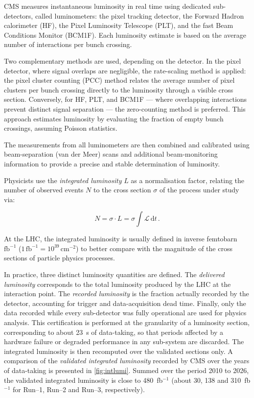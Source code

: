 \vspace{0.5 cm}

CMS measures instantaneous luminosity in real time using dedicated sub-detectors, called luminometers: the pixel tracking detector, the Forward Hadron calorimeter (HF), the Pixel Luminosity Telescope (PLT), and the fast Beam Conditions Monitor (BCM1F). Each luminosity estimate is based on the average number of interactions per bunch crossing.

Two complementary methods are used, depending on the detector. In the pixel detector, where signal overlaps are negligible, the rate-scaling method is applied: the pixel cluster counting (PCC) method relates the average number of pixel clusters per bunch crossing directly to the luminosity through a visible cross section. Conversely, for HF, PLT, and BCM1F --- where overlapping interactions prevent distinct signal separation --- the zero-counting method is preferred. This approach estimates luminosity by evaluating the fraction of empty bunch crossings, assuming Poisson statistics.

The measurements from all luminometers are then combined and calibrated using beam-separation (van der Meer) scans and additional beam-monitoring information to provide a precise and stable determination of luminosity.

\vspace{0.5 cm}

Physicists use the \textit{integrated luminosity} $L$ as a normalisation factor, relating the number of observed events $N$ to the cross section $\sigma$ of the process under study via:

\begin{equation}
    N = \sigma \cdot L = \sigma \int \mathscr{L} \, \mathrm{d}t \,.
    \label{eq:intlumi}
\end{equation}

At the LHC, the integrated luminosity is usually defined in inverse femtobarn $\mathrm{fb}^{-1}$ ($1\,\mathrm{fb}^{-1} = 10^{39} \, \mathrm{cm}^{-2}$) to better compare with the magnitude of the cross sections of particle physics processes. 

In practice, three distinct luminosity quantities are defined. The \textit{delivered luminosity} corresponds to the total luminosity produced by the LHC at the interaction point. The \textit{recorded luminosity} is the fraction actually recorded by the detector, accounting for trigger and data-acquisition dead time. Finally, only the data recorded while every sub-detector was fully operational are used for physics analysis. This certification is performed at the granularity of a luminosity section, corresponding to about 23~s of data-taking, so that periods affected by a hardware failure or degraded performance in any sub-system are discarded. The integrated luminosity is then recomputed over the validated sections only. A comparison of the \textit{validated integrated luminosity} recorded by CMS over the years of data-taking is presented in \cref{fig:intlumi}.  Summed over the period 2010 to 2026, the validated integrated luminosity is close to 480~fb$^{-1}$ (about 30, 138 and 310~fb$^{-1}$ for Run--1, Run--2 and Run--3, respectively).


